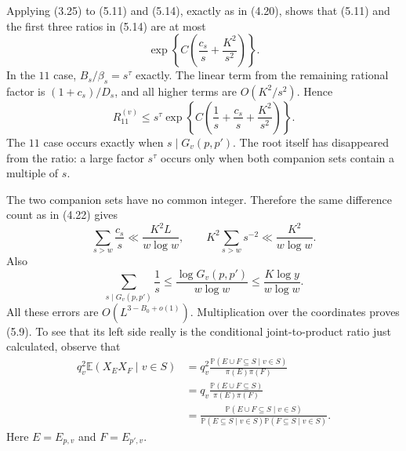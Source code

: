 \documentclass[10pt,letterpaper]{article}
\newcommand{\PP}{\mathbb{P}}
\newcommand{\EE}{\mathbb{E}}
\begin{document}
Applying (3.25) to (5.11) and (5.14), exactly as in (4.20), shows that (5.11) and the first three ratios in (5.14)
are at most
\begin{equation}
\exp\left\{C\left(\frac{c_s}{s}+\frac{K^2}{s^2}\right)\right\}.
\tag{5.15}
\end{equation}
In the $11$ case, $B_s/\beta_s=s^\tau$ exactly. The linear term from the remaining rational factor is $(1+c_s)/D_s$, and
all higher terms are $O(K^2/s^2)$. Hence
\begin{equation}
R_{11}^{(v)}\le s^\tau\exp\left\{C\left(\frac1s+\frac{c_s}{s}+\frac{K^2}{s^2}\right)\right\}.
\tag{5.16}
\end{equation}
The $11$ case occurs exactly when $s\mid G_v(p,p')$. The root itself has disappeared from the ratio: a large factor
$s^\tau$ occurs only when both companion sets contain a multiple of $s$.

The two companion sets have no common integer. Therefore the same difference count as in (4.22) gives
\begin{equation}
\sum_{s>w}\frac{c_s}{s}\ll\frac{K^2L}{w\log w},\qquad
K^2\sum_{s>w}s^{-2}\ll\frac{K^2}{w\log w}.
\tag{5.17}
\end{equation}
Also
\begin{equation}
\sum_{s\mid G_v(p,p')}\frac1s
\le\frac{\log G_v(p,p')}{w\log w}\le\frac{K\log y}{w\log w}.
\tag{5.18}
\end{equation}
All these errors are $O(L^{3-B_0+o(1)})$. Multiplication over the coordinates proves (5.9). To see that its left side
really is the conditional joint-to-product ratio just calculated, observe that
\begin{equation}
\begin{aligned}
q_v^2\EE(X_EX_F\mid v\in S)
&=q_v^2\frac{\PP(E\cup F\subseteq S\mid v\in S)}{\pi(E)\pi(F)}\\
&=q_v\frac{\PP(E\cup F\subseteq S)}{\pi(E)\pi(F)}\\
&=\frac{\PP(E\cup F\subseteq S\mid v\in S)}
{\PP(E\subseteq S\mid v\in S)\PP(F\subseteq S\mid v\in S)}.
\end{aligned}
\tag{5.19}
\end{equation}
Here $E=E_{p,v}$ and $F=E_{p',v}$.
\end{document}
